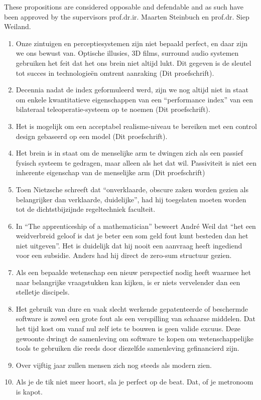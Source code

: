 \documentclass[10pt]{article}%
\newcommand{\mystelling}[1]{%
\item #1
}%
\begin{document}
%
%
%

\vfill \noindent These propositions are considered opposable and defendable and as such have been approved by the supervisors 
prof.dr.ir. Maarten Steinbuch en prof.dr. Siep Weiland.
\newpage

%
\begin{enumerate}
\mystelling{Onze zintuigen en perceptiesystemen zijn niet bepaald perfect, en daar zijn we ons bewust van. Optische illusies, 3D films, 
surround audio systemen gebruiken het feit dat het ons brein niet altijd lukt. Dit gegeven is de sleutel tot succes in technologieën 
omtrent aanraking (Dit proefschrift).}
%
%
\mystelling{Decennia nadat de index geformuleerd werd, zijn we nog altijd niet in staat om enkele kwantitatieve eigenschappen van een 
\enquote{performance index} van een bilateraal teleoperatie-systeem op te noemen (Dit proefschrift).}
%
\mystelling{Het is mogelijk om een acceptabel realisme-niveau te bereiken met een control design gebaseerd op een model (Dit proefschrift).}
%
\mystelling{Het brein is in staat om de menselijke arm te dwingen zich als een passief fysisch systeem te gedragen, maar alleen als het 
dat wil. Passiviteit is niet een inherente eigenschap van de menselijke arm (Dit proefschrift)}
%
\mystelling{Toen Nietzsche schreeft dat \enquote{onverklaarde, obscure zaken worden gezien als belangrijker dan verklaarde, duidelijke}, 
had hij toegelaten moeten worden tot de dichtstbijzijnde regeltechniek faculteit.}
%
\mystelling{In \enquote{The apprenticeship of a mathematician} beweert André Weil dat \enquote{het een weidverbreid geloof is dat je beter 
een som geld fout kunt besteden dan het niet uitgeven}. Het is duidelijk dat hij nooit een aanvraag heeft ingediend voor een subsidie. 
Anders had hij direct de zero-sum structuur gezien.}
%
\mystelling{Als een bepaalde wetenschap een nieuw perspectief nodig heeft waarmee het naar belangrijke vraagstukken kan kijken, is er 
niets vervelender dan een stelletje discipels.}
%
\mystelling{Het gebruik van dure en vaak slecht werkende gepatenteerde of beschermde software is zowel een grote fout als een verspilling 
van schaarse middelen. Dat het tijd kost om vanaf nul zelf iets te bouwen is geen valide excuus. Deze gewoonte dwingt de samenleving om 
software te kopen om wetenschappelijke tools te gebruiken die reeds door diezelfde samenleving gefinancierd zijn.}
%
\mystelling{Over vijftig jaar zullen mensen zich nog steeds als modern zien.}
%
\mystelling{Als je de tik niet meer hoort, sla je perfect op de beat. Dat, of je metronoom is kapot.}

\end{enumerate}
\end{document}
